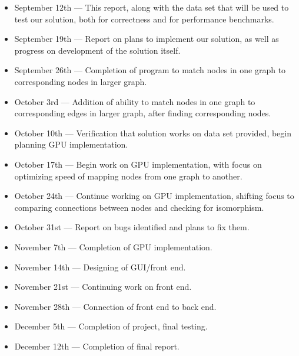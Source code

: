 \documentclass{article}
\begin{document}
\begin{itemize}
  \item September 12th --- This report, along with the data set that will be used to test our solution, both for correctness and for performance benchmarks.
  \item September 19th --- Report on plans to implement our solution, as well as progress on development of the solution itself.
  \item September 26th --- Completion of program to match nodes in one graph to corresponding nodes in larger graph.
  \item October 3rd ---  Addition of ability to match nodes in one graph to corresponding edges in larger graph, after finding corresponding nodes.
  \item October 10th --- Verification that solution works on data set provided, begin planning GPU implementation.
  \item October 17th --- Begin work on GPU implementation, with focus on optimizing speed of mapping nodes from one graph to another.
  \item October 24th --- Continue working on GPU implementation, shifting focus to comparing connections between nodes and checking for isomorphism.
  \item October 31st --- Report on bugs identified and plans to fix them.
  \item November 7th --- Completion of GPU implementation. 
  \item November 14th --- Designing of GUI/front end.
  \item November 21st --- Continuing work on front end.
  \item November 28th --- Connection of front end to back end.
  \item December 5th --- Completion of project, final testing.
  \item December 12th --- Completion of final report.
\end{itemize}
\end{document}
